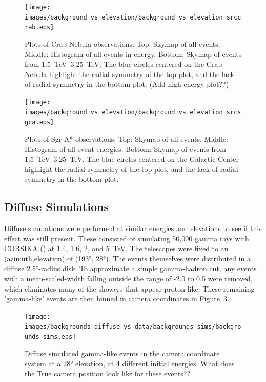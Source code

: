   \begin{figure}[ht]
    \centering
    \texttt{[image: images/background\_vs\_elevation/background\_vs\_elevation\_srccrab.eps]}
    \caption[Background Vs Elevation Crab]
    {\small 
      Plots of Crab Nebula observations.
      Top: Skymap of all events.
      Middle: Histogram of all events in energy.
      Bottom: Skymap of events from \SIrange{1.5}{3.25}{\TeV}.  
      The blue circles centered on the Crab Nebula highlight the radial symmetry of the top plot, and the lack of radial symmetry in the bottom plot.
      {\color{red}(Add high energy plot??)}
    }
    \label{fig:bkgvsel_crab}
  \end{figure}

  \begin{figure}[ht]
    \centering
    \texttt{[image: images/background\_vs\_elevation/background\_vs\_elevation\_srcsgra.eps]}
    \caption[Background Vs Elevation Sgr A*]
    {\small 
      Plots of Sgr A* observations.
      Top: Skymap of all events.
      Middle: Histogram of all event energies.
      Bottom: Skymap of events from \SIrange{1.5}{3.25}{\TeV}.  
      The blue circles centered on the Galactic Center highlight the radial symmetry of the top plot, and the lack of radial symmetry in the bottom plot.
    }
    \label{fig:bkgvsel_sgra}
  \end{figure}
  
  \FloatBarrier

  \subsection{Diffuse Simulations}\label{subsubsec:diffusesims}
    Diffuse simulations were performed at similar energies and elevations to see if this effect was still present.
    These consisted of simulating 50,000 gamma rays with CORSIKA (\cite{corsika1998}) at 1.4, 1.6, 2, and \SI{5}{\TeV}.
    The telescopes were fixed to an (azimuth,elevation) of (\ang{193}, \ang{28}).
    The events themselves were distributed in a diffuse \ang{2.5}-radius disk.
    To approximate a simple gamma-hadron cut, any events with a mean-scaled-width falling outside the range of -2.0 to 0.5 were removed, which eliminates many of the showers that appear proton-like.
    These remaining 'gamma-like' events are then binned in camera coordinates in Figure~\ref{fig:back_simdiffuse}.

    \begin{figure}[ht]
      \centering
      \texttt{[image: images/backgrounds\_diffuse\_vs\_data/backgrounds\_sims/backgrounds\_sims.eps]}
      \caption[Diffuse Simulated Backgrounds]{
        Diffuse simulated gamma-like events in the camera coordinate system at a \ang{28} elevation, at 4 different initial energies.
        {\color{red}What does the True camera position look like for these events??}
      }
      \label{fig:back_simdiffuse}
    \end{figure}

